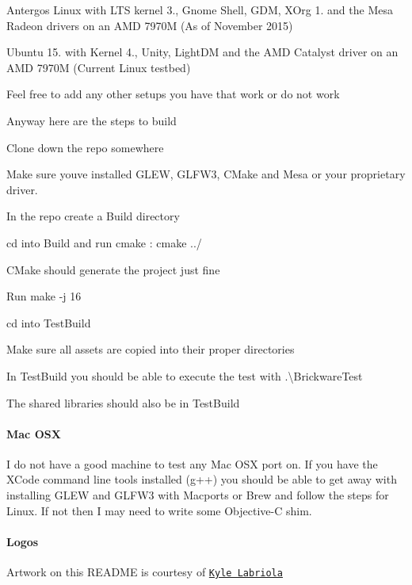 Antergos Linux with L\+T\+S kernel 3., Gnome Shell, G\+D\+M, X\+Org 1. and the Mesa Radeon drivers on an A\+M\+D 7970\+M (As of November 2015)

Ubuntu 15. with Kernel 4., Unity, Light\+D\+M and the A\+M\+D Catalyst driver on an A\+M\+D 7970\+M (Current Linux testbed)

Feel free to add any other setups you have that work or do not work

Anyway here are the steps to build


\begin{DoxyItemize}
\item Clone down the repo somewhere
\item Make sure you\textquotesingle{}ve installed G\+L\+E\+W, G\+L\+F\+W3, C\+Make and Mesa or your proprietary driver.
\item In the repo create a Build directory
\item cd into Build and run cmake \+: {\ttfamily cmake ../}
\item C\+Make should generate the project just fine
\item Run {\ttfamily make -\/j 16}
\item cd into Test\+Build
\item Make sure all assets are copied into their proper directories
\item In Test\+Build you should be able to execute the test with {\ttfamily .\textbackslash{}Brickware\+Test}
\item The shared libraries should also be in Test\+Build
\end{DoxyItemize}

\paragraph*{Mac O\+S\+X}

I do not have a good machine to test any Mac O\+S\+X port on. If you have the X\+Code command line tools installed (g++) you should be able to get away with installing G\+L\+E\+W and G\+L\+F\+W3 with Macports or Brew and follow the steps for Linux. If not then I may need to write some Objective-\/\+C shim.

\paragraph*{Logos}

Artwork on this R\+E\+A\+D\+M\+E is courtesy of \href{http://www.kylelabriola.com/}{\tt Kyle Labriola} 